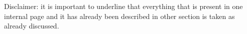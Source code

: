 Disclaimer: it is important to underline that everything that is present
in one internal page and it has already been described in other section is
taken as already discussed.